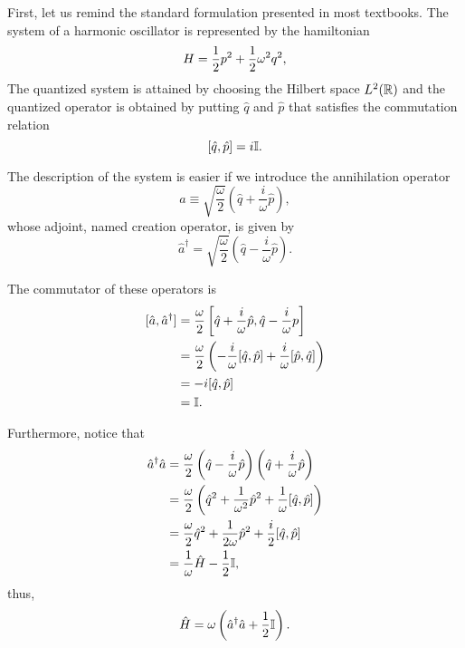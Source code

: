 First, let us remind the standard formulation presented in most textbooks. The system of a harmonic oscillator is represented by the hamiltonian 
\begin{equation}
    H=\frac{1}{2}p^2+\frac{1}{2}\omega^2q^2,
\end{equation}
The quantized system is attained by choosing the Hilbert space \(L^2({\mathbb{R}})\) and the quantized operator is obtained by putting \(\hat{q}\) and \(\hat{p}\) that satisfies the commutation relation
\begin{equation}
    \relax[\hat{q},\hat{p}]=i{\mathbb{I}}.
\end{equation}

The description of the system is easier if we introduce the annihilation operator
\begin{equation}
    \hat{a}\equiv\sqrt{\frac{\omega}{2}}\left(\hat{q}+\frac{i}{\omega}\hat{p}\right),
\end{equation}
whose adjoint, named creation operator, is given by
\begin{equation}
    \hat{a}^{\dagger}=\sqrt{\frac{\omega}{2}}\left(\hat{q}-\frac{i}{\omega}\hat{p}\right).
\end{equation}

The commutator of these operators is
\begin{subequations}
    \begin{align}
        \relax[\hat{a},\hat{a}^{\dagger}]&=\frac{\omega}{2}\left[\hat{q}+\frac{i}{\omega}\hat{p},\hat{q}-\frac{i}{\omega}p\right]\\
        &=\frac{\omega}{2}\left(-\frac{i}{\omega}[\hat{q},\hat{p}]+\frac{i}{\omega}[\hat{p},\hat{q}]\right)\\
        &=-i[\hat{q},\hat{p}]\\
        &={\mathbb{I}}.
    \end{align}
\end{subequations}

Furthermore, notice that
\begin{subequations}
    \begin{align}
        \hat{a}^{\dagger}\hat{a}&=\frac{\omega}{2}\left(\hat{q}-\frac{i}{\omega}\hat{p}\right)\left(\hat{q}+\frac{i}{\omega}\hat{p}\right)\\
        &=\frac{\omega}{2}\left(\hat{q}^2+\frac{1}{\omega^2}\hat{p}^2+\frac{1}{\omega}[\hat{q},\hat{p}]\right)\\
        &=\frac{\omega}{2}\hat{q}^2+\frac{1}{2\omega}\hat{p}^2+\frac{i}{2}[\hat{q},\hat{p}]\\
        &=\frac{1}{\omega}\hat{H}-\frac{1}{2}{\mathbb{I}},
    \end{align}
\end{subequations}
thus,
\begin{equation}
    \hat{H}=\omega\left(\hat{a}^\dagger\hat{a}+\frac{1}{2}{\mathbb{I}}\right).
\end{equation}

